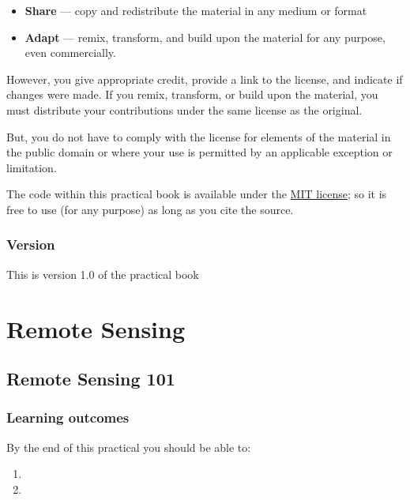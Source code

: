 \documentclass[
]{book}
\providecommand{\tightlist}{%
  \setlength{\itemsep}{0pt}\setlength{\parskip}{0pt}}
\begin{document}
\begin{itemize}
\item
  \textbf{Share} --- copy and redistribute the material in any medium or format
\item
  \textbf{Adapt} --- remix, transform, and build upon the material
  for any purpose, even commercially.
\end{itemize}

However, you give appropriate credit, provide a link to the license, and indicate if changes were made. If you remix, transform, or build upon the material, you must distribute your contributions under the same license as the original.

But, you do not have to comply with the license for elements of the material in the public domain or where your use is permitted by an applicable exception or limitation.

The code within this practical book is available under the \href{https://opensource.org/licenses/MIT}{MIT license}; so it is free to use (for any purpose) as long as you cite the source.

\hypertarget{version}{%
\section*{Version}\label{version}}

This is version 1.0 of the practical book

\hypertarget{part-remote-sensing}{%
\part{Remote Sensing}\label{part-remote-sensing}}

\hypertarget{remote-sensing-101}{%
\chapter{Remote Sensing 101}\label{remote-sensing-101}}

\hypertarget{learning-outcomes-1}{%
\section{Learning outcomes}\label{learning-outcomes-1}}

By the end of this practical you should be able to:

\begin{enumerate}
\def\labelenumi{\arabic{enumi}.}
\tightlist
\item
\item
\end{enumerate}
\end{document}
